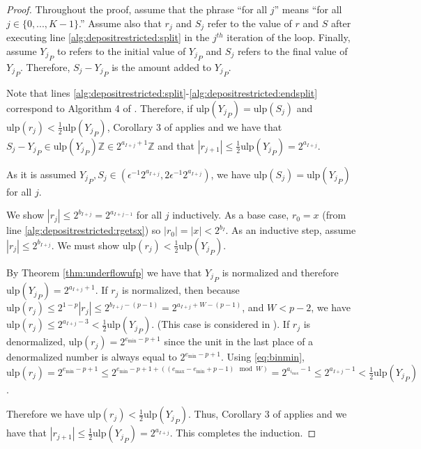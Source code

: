 \documentclass[12pt]{article}
\providecommand{\Z}{\ensuremath{\mathbb{Z}}}
\providecommand{\min}{\ensuremath{\text{min}}}
\providecommand{\max}{\ensuremath{\text{max}}}
\providecommand{\ulp}{\ensuremath{\text{ulp}}}
\theoremstyle{definition}
\numberwithin{equation}{section}
\numberwithin{figure}{section}
\begin{document}
      \begin{proof}
        Throughout the proof, assume that the phrase ``for all $j$'' means ``for all $j \in \{0, ..., K - 1\}$.'' Assume also that $r_j$ and $S_j$ refer to the value of $r$ and $S$ after executing line \ref{alg:depositrestricted:split} in the $j^{th}$ iteration of the loop. Finally, assume ${Y_j}_P$ to refers to the initial value of ${Y_j}_P$ and $S_j$ refers to the final value of ${Y_j}_P$. Therefore, $S_j - {Y_j}_P$ is the amount added to ${Y_j}_P$.

        Note that lines \ref{alg:depositrestricted:split}-\ref{alg:depositrestricted:endsplit} correspond to Algorithm 4 of \cite{repsum}.
        Therefore, if $\ulp({Y_j}_P) = \ulp(S_j)$ and $\ulp(r_j) < \frac{1}{2}\ulp({Y_j}_P)$, Corollary 3 of \cite{repsum} applies and we have that $S_j - {Y_j}_P \in \ulp({Y_j}_P)\Z \in 2^{a_{I + j} + 1}\Z$ and that $|r_{j + 1}| \leq \frac{1}{2}\ulp({Y_j}_P) = 2^{a_{I + j}}$.

        As it is assumed ${Y_j}_P, S_j \in (\epsilon^{-1}  2^{a_{I + j}}, 2  \epsilon^{-1}  2^{a_{I + j}})$, we have $\ulp(S_j) = \ulp({Y_j}_P)$ for all $j$.

        We show $|r_j| \leq 2^{b_{I + j}} = 2^{a_{I + j - 1}}$ for all $j$ inductively. As a base case, $r_0 = x$ (from line \ref{alg:depositrestricted:rgetsx}) so $|r_0| = |x| < 2^{b_{I}}$.
        As an inductive step, assume $|r_j| \leq 2^{b_{I + j}}$. We must show $\ulp(r_j) < \frac{1}{2}\ulp({Y_j}_P)$.

        By Theorem \ref{thm:underflowufp} we have that ${Y_j}_P$ is normalized and therefore $\ulp({Y_j}_P) = 2^{a_{I + j} + 1}$.
        If $r_j$ is normalized, then because $\ulp(r_j) \leq 2^{1 - p}|r_j| \leq 2^{b_{I + j} - (p - 1)} = 2^{a_{I + j} + W - (p - 1)}$, and $W < p - 2$, we have $\ulp(r_j) \leq 2^{a_{I + j} - 3} < \frac{1}{2}\ulp({Y_j}_P)$. (This case is considered in \cite{repsum}).
      If $r_j$ is denormalized, $\ulp(r_j) = 2^{e_{\min} - p + 1}$ since the unit in the last place of a denormalized number is always equal to $2^{e_{\min} - p + 1}$. Using \eqref{eq:binmin}, $\ulp(r_j) = 2^{e_{\min} - p + 1} \leq 2^{e_{\min} - p + 1 + ((e_{\max} - e_{\min} + p - 1) \mod W)} = 2^{a_{i_{\max}} - 1} \leq 2^{a_{I + j} - 1} < \frac{1}{2}\ulp({Y_j}_P)$.

        Therefore we have $\ulp(r_j) < \frac{1}{2}\ulp({Y_j}_P)$. Thus, Corollary 3 of \cite{repsum} applies and we have that $|r_{j + 1}| \leq \frac{1}{2}\ulp({Y_j}_P) = 2^{a_{I + j}}$. This completes the induction.


\end{proof}
\end{document}
